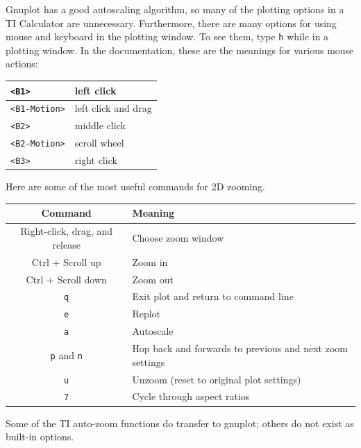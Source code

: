 \documentclass[11pt,letterpaper]{report}
\begin{document}
Gnuplot has a good autoscaling algorithm, so many of the plotting options in a TI Calculator are unnecessary. Furthermore, there are many options for using mouse and keyboard in the plotting window. To see them, type \lstinline+h+ while in a plotting window. In the documentation, these are the meanings for various mouse actions:

\begin{center}
	\begin{tabular}{|l|l|}
	\hline 
	\verb+<B1>+ & left click \\
	\hline
	\verb+<B1-Motion>+ & left click and drag \\
	\hline
	\verb+<B2>+ & middle click \\
	\hline
	\verb+<B2-Motion>+ & scroll wheel \\
	\hline
	\verb+<B3>+ & right click \\
	\hline
	\end{tabular}
\end{center}

Here are some of the most useful commands for 2D zooming.

\begin{center}
	\begin{tabular}{|c|l|}
	\hline 
	Command & Meaning \\
	\hline
	Right-click, drag, and release & Choose zoom window \\
	\hline
	Ctrl + Scroll up & Zoom in \\
	\hline
	Ctrl + Scroll down & Zoom out \\
	\hline
	\verb+q+ & Exit plot and return to command line \\
	\hline
	\verb+e+ & Replot \\
	\hline
	\verb+a+ & Autoscale \\
	\hline
	\verb+p+ and \verb+n+ & Hop back and forwards to previous and next zoom settings\\
	\hline
	\verb+u+ & Unzoom (reset to original plot settings) \\
	\hline
	\verb+7+ & Cycle through aspect ratios \\
	\hline
	\end{tabular}
\end{center}

Some of the TI auto-zoom functions do transfer to gnuplot; others do not exist as built-in options.
\end{document}
